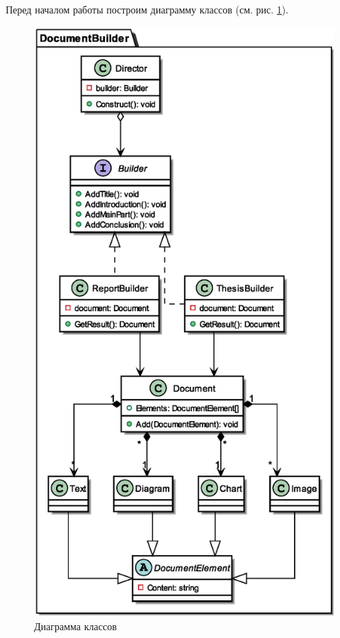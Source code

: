 \documentclass[PI,LAB]{HSEUniversity}
\begin{document}
Перед началом работы построим диаграмму классов (см. рис. \ref{fig:Task_CD}).
 \begin{figure}[p]
   \centering
   \includegraphics[scale=0.75]{Task_CD.eps}
   \caption{Диаграмма классов}
   \label{fig:Task_CD}
 \end{figure}
\end{document}
